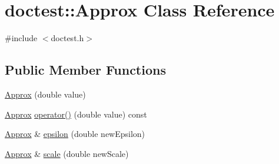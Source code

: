 \hypertarget{classdoctest_1_1_approx}{}\section{doctest\+:\+:Approx Class Reference}
\label{classdoctest_1_1_approx}


{\ttfamily \#include $<$doctest.\+h$>$}

\subsection*{Public Member Functions}
\begin{DoxyCompactItemize}
\item 
\mbox{\hyperlink{classdoctest_1_1_approx_a86f0d1b44c1cf095697f23ccdab00802}{Approx}} (double value)
\item 
\mbox{\hyperlink{classdoctest_1_1_approx}{Approx}} \mbox{\hyperlink{classdoctest_1_1_approx_aae907c5ea1c4ac94e134db9e35da7dce}{operator()}} (double value) const
\item 
\mbox{\hyperlink{classdoctest_1_1_approx}{Approx}} \& \mbox{\hyperlink{classdoctest_1_1_approx_af8df6b0af00fd875e5b6a0c30b86f636}{epsilon}} (double new\+Epsilon)
\item 
\mbox{\hyperlink{classdoctest_1_1_approx}{Approx}} \& \mbox{\hyperlink{classdoctest_1_1_approx_a62185fd4c09a63dab61bd893574d8473}{scale}} (double new\+Scale)
\end{DoxyCompactItemize}

